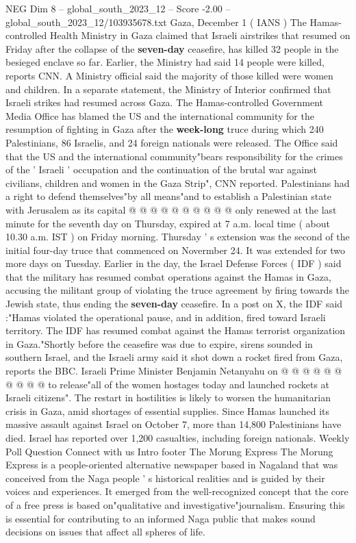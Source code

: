 \begin{textsample}{NEG Dim 8 – global\_south\_2023\_12 – Score -2.00 – global\_south\_2023\_12/103935678.txt}  \label{ex:f8_neg_016}
Gaza, December 1 ( IANS ) The Hamas-controlled Health Ministry in Gaza claimed that Israeli airstrikes that resumed on Friday after the collapse of the \textbf{seven-day} ceasefire, has killed 32 people in the besieged enclave so far.
Earlier, the Ministry had said 14 people were killed, reports CNN.
A Ministry official said the majority of those killed were women and children.
In a separate statement, the Ministry of Interior confirmed that Israeli strikes had resumed across Gaza.
The Hamas-controlled Government Media Office has blamed the US and the international community for the resumption of fighting in Gaza after the \textbf{week-long} truce during which 240 Palestinians, 86 Israelis, and 24 foreign nationals were released.
The Office said that the US and the international community"bears responsibility for the crimes of the ' Israeli ' occupation and the continuation of the brutal war against civilians, children and women in the Gaza Strip", CNN reported.
Palestinians had a right to defend themselves"by all means"and to establish a Palestinian state with Jerusalem as its capital @ @ @ @ @ @ @ @ @ @ only renewed at the last minute for the seventh day on Thursday, expired at 7 a.m. local time ( about 10.30 a.m.
IST ) on Friday morning.
Thursday ' s extension was the second of the initial four-day truce that commenced on Novermber 24.
It was extended for two more days on Tuesday.
Earlier in the day, the Israel Defense Forces ( IDF ) said that the military has resumed combat operations against the Hamas in Gaza, accusing the militant group of violating the truce agreement by firing towards the Jewish state, thus ending the \textbf{seven-day} ceasefire.
In a post on X, the IDF said :"Hamas violated the operational pause, and in addition, fired toward Israeli territory.
The IDF has resumed combat against the Hamas terrorist organization in Gaza."Shortly before the ceasefire was due to expire, sirens sounded in southern Israel, and the Israeli army said it shot down a rocket fired from Gaza, reports the BBC.
Israeli Prime Minister Benjamin Netanyahu on @ @ @ @ @ @ @ @ @ @ to release"all of the women hostages today and launched rockets at Israeli citizens".
The restart in hostilities is likely to worsen the humanitarian crisis in Gaza, amid shortages of essential supplies.
Since Hamas launched its massive assault against Israel on October 7, more than 14,800 Palestinians have died.
Israel has reported over 1,200 casualties, including foreign nationals.
Weekly Poll Question Connect with us Intro footer The Morung Express The Morung Express is a people-oriented alternative newspaper based in Nagaland that was conceived from the Naga people ' s historical realities and is guided by their voices and experiences.
It emerged from the well-recognized concept that the core of a free press is based on"qualitative and investigative"journalism.
Ensuring this is essential for contributing to an informed Naga public that makes sound decisions on issues that affect all spheres of life.

\end{textsample}
